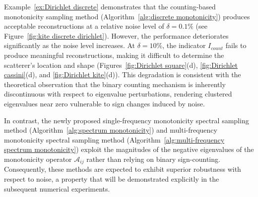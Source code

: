 \documentclass[11pt,reqno,twoside]{amsart}
\theoremstyle{definition}
\theoremstyle{remark}
\numberwithin{equation}{section}
\begin{document}
Example~\ref{ex:Dirichlet discrete} demonstrates that the counting-based monotonicity sampling method (Algorithm~\ref{alg:discrete monotonicity}) produces acceptable reconstructions at a relative noise level of $\delta = 0.1\%$ (see Figure~\ref{fig:kite discrete dirichlet}). However, the performance deteriorates significantly as the noise level increases. At $\delta = 10\%$, the indicator $I_{count}$ fails to produce meaningful reconstructions, making it difficult to determine the scatterer's location and shape (Figures~\ref{fig:Dirichlet square}(d), \ref{fig:Dirichlet cassini}(d), and \ref{fig:Dirichlet kite}(d)). This degradation is consistent with the theoretical observation that the binary counting mechanism is inherently discontinuous with respect to eigenvalue perturbations, rendering clustered eigenvalues near zero vulnerable to sign changes induced by noise.

In contrast, the newly proposed single-frequency monotonicity spectral sampling method (Algorithm~\ref{alg:spectrum monotonicity}) and multi-frequency monotonicity spectral sampling method (Algorithm~\ref{alg:multi-frequency spectrum monotonicity}) exploit the magnitudes of the negative eigenvalues of the monotonicity operator $\mathcal{A}_{ij}$ rather than relying on binary sign-counting. Consequently, these methods are expected to exhibit superior robustness with respect to noise, a property that will be demonstrated explicitly in the subsequent numerical experiments.
\end{document}
